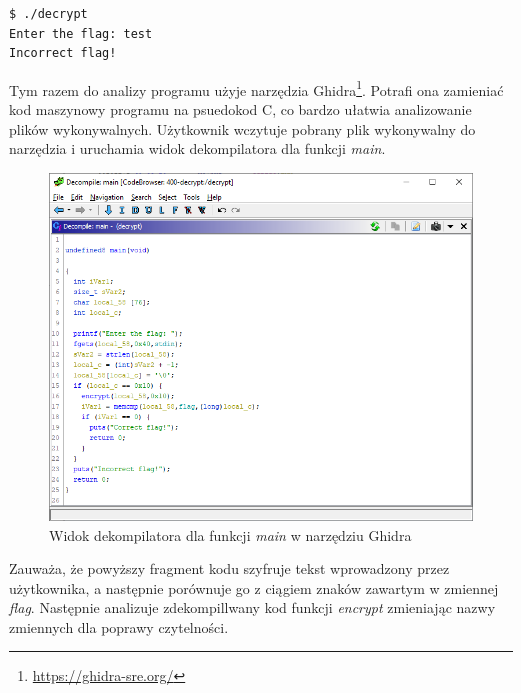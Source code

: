 \documentclass[language=polish,type=eng]{aghmodern}
\begin{document}
\begin{verbatim}
$ ./decrypt
Enter the flag: test
Incorrect flag!
\end{verbatim}

Tym razem do analizy programu użyje narzędzia Ghidra\footnote{\url{https://ghidra-sre.org/}}.
Potrafi ona zamieniać kod maszynowy programu na psuedokod C, co bardzo ułatwia
analizowanie plików wykonywalnych.
Użytkownik wczytuje pobrany plik wykonywalny do narzędzia i uruchamia widok dekompilatora
dla funkcji \emph{main}.

\begin{figure}[H]
\centering
\includegraphics[width=\textwidth]{400_main}
\caption{Widok dekompilatora dla funkcji \emph{main} w narzędziu Ghidra}
\end{figure}

Zauważa, że powyższy fragment kodu szyfruje tekst wprowadzony przez użytkownika,
a następnie porównuje go z ciągiem znaków zawartym w zmiennej \emph{flag}.
Następnie analizuje zdekompillwany kod funkcji \emph{encrypt} zmieniając nazwy zmiennych
dla poprawy czytelności.
\end{document}
